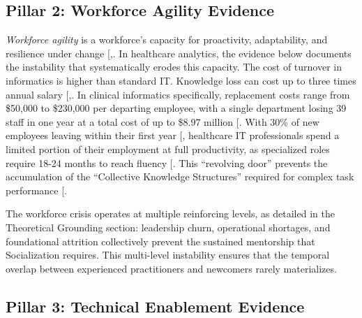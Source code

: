 \documentclass[
  american,
  11pt,
  letterpaper,
  oneside  ,captions=tableheading
]{scrartcl}
\begin{document}
\subsection{Pillar 2: Workforce Agility
Evidence}\label{pillar-2-workforce-agility-evidence}

\emph{Workforce agility} is a workforce's capacity for proactivity,
adaptability, and resilience under change
{[},\citeproc{ref-tessarini2021}{51}{]}. In
healthcare analytics, the evidence below documents the instability that
systematically erodes this capacity. The cost of turnover in informatics
is higher than standard IT. Knowledge loss can cost up to three times
annual salary
{[},\citeproc{ref-wynendaele2025}{52}{]}.
In clinical informatics specifically, replacement costs range from
\$50,000 to \$230,000 per departing employee, with a single department
losing 39 staff in one year at a total cost of up to \$8.97 million
{[}\citeproc{ref-hackney2024}{53}{]}. With 30\% of new employees leaving
within their first year {[}\citeproc{ref-nsi2025}{23}{]}, healthcare IT
professionals spend a limited portion of their employment at full
productivity, as specialized roles require 18-24 months to reach fluency
{[}\citeproc{ref-ledikwe2013}{17}{]}. This ``revolving door'' prevents
the accumulation of the ``Collective Knowledge Structures'' required for
complex task performance {[}\citeproc{ref-rao2006}{13}{]}.

The workforce crisis operates at multiple reinforcing levels, as
detailed in the Theoretical Grounding section: leadership churn,
operational shortages, and foundational attrition collectively prevent
the sustained mentorship that Socialization requires. This multi-level
instability ensures that the temporal overlap between experienced
practitioners and newcomers rarely materializes.

\subsection{Pillar 3: Technical Enablement
Evidence}\label{pillar-3-technical-enablement-evidence}
\end{document}
